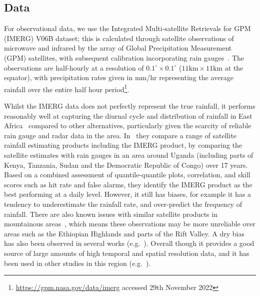 \documentclass{article}
\begin{document}
\subsection{Data}

\label{sec:data}


For observational data, we use the Integrated Multi-satellite Retrievals for GPM (IMERG) V06B dataset; this is calculated through satellite observations of microwave and infrared by the array of Global Precipitation Measurement (GPM) satellites, with subsequent calibration incorporating rain gauges~\citep{huffman_nasa_2018}. The observations are half-hourly at a resolution of $0.1^{\circ} \times 0.1^{\circ}$ ($11\text{km} \times 11\text{km}$ at the equator), with precipitation rates given in mm/hr representing the average rainfall over the entire half hour period\footnote{\href{https://gpm.nasa.gov/data/imerg}{https://gpm.nasa.gov/data/imerg} accessed 29th November 2022}.


Whilst the IMERG data does not perfectly represent the true rainfall, it performs reasonably well at capturing the diurnal cycle and distribution of rainfall in East Africa~\citep{dezfuli_validation_2017, roca_comparing_2010, camberlin_major_2018} compared to other alternatives, particularly given the scarcity of reliable rain gauge and radar data in the area.  In~\cite{ageet_validation_2022} they compare a range of satellite rainfall estimating products including the IMERG product, by comparing the satellite estimates with rain gauges in an area around Uganda (including parts of Kenya, Tanzania, Sudan and the Democratic Republic of Congo) over 17 years. Based on a combined assessment of quantile-quantile plots, correlation, and skill scores such as hit rate and false alarms, they identify the IMERG product as the best performing at a daily level. However, it still has biases, for example it has a tendency to underestimate the rainfall rate, and over-predict the frequency of rainfall. There are also known issues with similar satellite products in mountainous areas~\citep{dinku_comparison_2010}, which means these observations may be more unreliable over areas such as the Ethiopian Highlands and parts of the Rift Valley. A dry bias has also been observed in several works (e.g.~\cite{vogel_skill_2018}). Overall though it provides a good source of large amounts of high temporal and spatial resolution data, and it has been used in other studies in this region (e.g.~\cite{woodhams_what_2018, finney_implications_2019, cafaro_convection-permitting_2021}).
\end{document}
